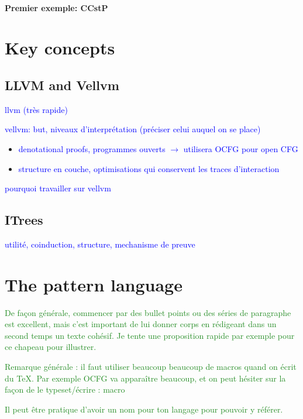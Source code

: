 \documentclass[11pt]{article}
\newcommand{\leon}[1]{\textcolor{blue}{#1}}
\newcommand{\yz}[1]{\textcolor{ForestGreen}{#1}}
\begin{document}
\paragraph{Premier exemple: CCstP}

\section{Key concepts}
\label{sec:concepts}

\subsection{LLVM and Vellvm}

\leon{llvm (très rapide)}

\leon{vellvm: but, niveaux d'interprétation (préciser celui auquel on se place)}

\begin{itemize}
  \item \leon{denotational proofs, programmes ouverts $\rightarrow$ utilisera OCFG pour open CFG}
  \item \leon{structure en couche, optimisations qui conservent les traces d'interaction}
\end{itemize}

\leon{pourquoi travailler sur vellvm}

\subsection{ITrees}

\leon{utilité, coinduction, structure, mechanisme de preuve}

\section{The pattern language}
\label{sec:lang}

\yz{De façon générale, commencer par des bullet points ou des séries de paragraphe est excellent, mais c'est important de lui donner corps en rédigeant dans un second temps un texte cohésif. Je tente une proposition rapide par exemple pour ce chapeau pour illustrer.}

\yz{Remarque générale : il faut utiliser beaucoup beaucoup de macros quand on écrit du TeX. Par exemple OCFG va apparaître beaucoup, et on peut hésiter sur la façon de le typeset/écrire : macro }

\yz{Il peut être pratique d'avoir un nom pour ton langage pour pouvoir y référer.}
\end{document}
